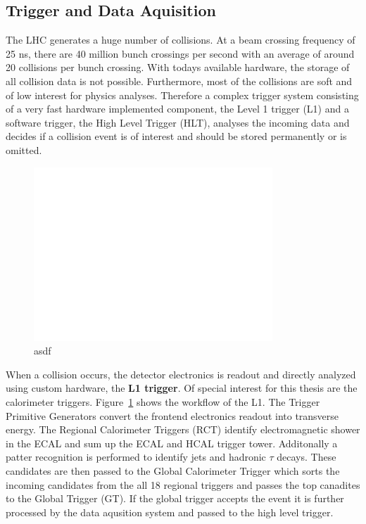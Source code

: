 \subsection{Trigger and Data Aquisition}

The LHC generates a huge number of collisions. At a beam crossing frequency of
25 ns, there are 40 million bunch crossings per second with an average of around
20 collisions per bunch crossing. With todays available hardware, the storage of
all collision data is not possible. Furthermore, most of the collisions are soft
and of low interest for physics analyses. Therefore a complex trigger system
consisting of a very fast hardware implemented component, the Level 1 trigger
(L1) and a software trigger, the High Level Trigger (HLT), analyses the incoming
data and decides if a collision event is of interest and should be stored
permanently or is omitted.

\begin{figure}[htb]
    \centering
    \includegraphics[width=0.8\textwidth]{figures/cms_detector/cms_l1_trigger.pdf}\hfill
    \caption[The L1 Trigger of CMS.]{asdf}
    \label{fig:cms:l1_trigger}
\end{figure}

When a collision occurs, the detector electronics is readout and directly
analyzed using custom hardware, the \textbf{L1 trigger}. Of special interest for this
thesis are the calorimeter triggers. Figure~\ref{fig:cms:l1_trigger} shows the 
workflow of the L1. The Trigger Primitive Generators convert the frontend
electronics readout into transverse energy. The Regional Calorimeter Triggers
(RCT) identify electromagnetic shower in the ECAL and sum up the ECAL and HCAL
trigger tower. Additonally a patter recognition is performed to identify jets
and hadronic $\tau$ decays. These candidates are then passed to the Global
Calorimeter Trigger which sorts the incoming candidates from the all 18 regional
triggers and passes the top canadites to the Global Trigger (GT). If the global
trigger accepts the event it is further processed by the data aqusition system
and passed to the high level trigger.

